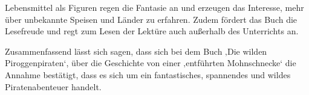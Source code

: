 Lebensmittel als Figuren regen die Fantasie an und erzeugen das Interesse, mehr über unbekannte Speisen und Länder zu erfahren. Zudem  fördert das Buch die Lesefreude und regt zum Lesen der Lektüre auch außerhalb des Unterrichts an.





Zusammenfassend lässt sich sagen, dass sich bei dem Buch ‚Die wilden Piroggenpiraten‘, über die Geschichte von einer ‚entführten Mohnschnecke‘ die Annahme bestätigt, dass es sich um ein fantastisches, spannendes und wildes Piratenabenteuer handelt.
